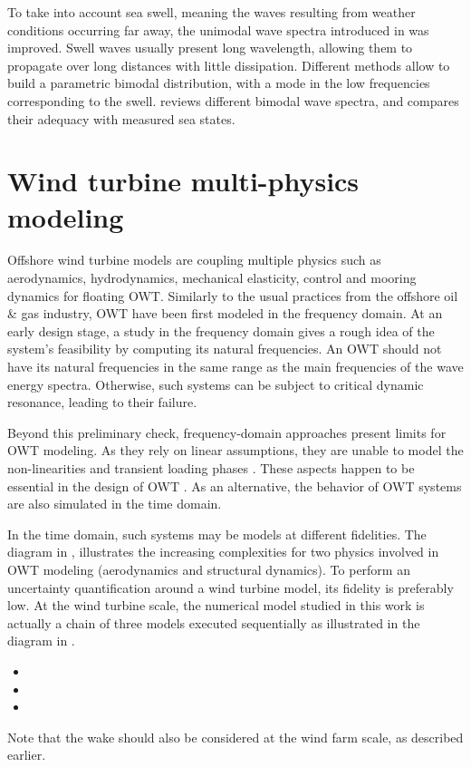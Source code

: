 To take into account sea swell, meaning the waves resulting from weather conditions occurring far away, the unimodal wave spectra introduced in  was improved. 
Swell waves usually present long wavelength, allowing them to propagate over long distances with little dissipation. 
Different methods allow to build a parametric bimodal distribution, with a mode in the low frequencies corresponding to the swell. 
\citet{guedes_2005_bimodal_jonswap} reviews different bimodal wave spectra, and compares their adequacy with measured sea states. 



\section{Wind turbine multi-physics modeling} \label{sec:owt_modeling}

Offshore wind turbine models are coupling multiple physics such as aerodynamics, hydrodynamics, mechanical elasticity, control and mooring dynamics for floating OWT. 
Similarly to the usual practices from the offshore oil \& gas industry, OWT have been first modeled in the frequency domain. 
At an early design stage, a study in the frequency domain gives a rough idea of the system's feasibility by computing its natural frequencies. 
An OWT should not have its natural frequencies in the same range as the main frequencies of the wave energy spectra. 
Otherwise, such systems can be subject to critical dynamic resonance, leading to their failure.

Beyond this preliminary check, frequency-domain approaches present limits for OWT modeling. 
As they rely on linear assumptions, they are unable to model the non-linearities and transient loading phases \citep{matha_2011_ISOPE}. 
These aspects happen to be essential in the design of OWT \citep{jonkman_2011_ISOPE}. 
As an alternative, the behavior of OWT systems are also simulated in the time domain. 

In the time domain, such systems may be models at different fidelities. 
The diagram in , illustrates the increasing complexities for two physics involved in OWT modeling (aerodynamics and structural dynamics). 
To perform an uncertainty quantification around a wind turbine model, its fidelity is preferably low. 
At the wind turbine scale, the numerical model studied in this work is actually a chain of three models executed sequentially as illustrated in the diagram in . 
\begin{itemize}
    \item {}
    \item {}
    \item {}
\end{itemize}
Note that the wake should also be considered at the wind farm scale, as described earlier. 

